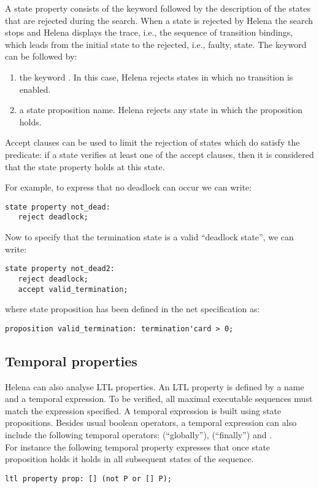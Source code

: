 A state property consists of the keyword  followed by the
description of the states that are rejected during the search.  When a
state is rejected by Helena the search stops and Helena displays the
trace, i.e., the sequence of transition bindings, which leads from the
initial state to the rejected, i.e., faulty, state.  The keyword
 can be followed by:
\begin{enumerate}
\item the keyword .  In this case, Helena rejects states
  in which no transition is enabled.
\item a state proposition name.  Helena rejects any state in which the
  proposition holds.
\end{enumerate}
Accept clauses can be used to limit the rejection of states which do
satisfy the  predicate: if a state verifies at least one of
the accept clauses, then it is considered that the state property
holds at this state.

For example, to express that no deadlock can occur we can write:
\begin{lstlisting}
state property not_dead:
   reject deadlock;
\end{lstlisting}
Now to specify that the termination state is a valid ``deadlock
state'', we can write:
\begin{lstlisting}
state property not_dead2:
   reject deadlock;
   accept valid_termination;
\end{lstlisting}
where state proposition  has been defined in the
net specification as:
\begin{lstlisting}
proposition valid_termination: termination'card > 0;
\end{lstlisting}

\statepropertydef

\subsection{Temporal properties}
Helena can also analyse LTL properties.  An LTL property is defined by
a name and a temporal expression.  To be verified, all maximal
executable sequences must match the expression specified.  A temporal
expression is built using state propositions.  Besides usual boolean
operators, a temporal expression can also include the following
temporal operators: \LS{[]} (``globally''), \LS{<>} (``finally'') and
.\\

For instance the following temporal property expresses that once state
proposition  holds it holds in all subsequent states of the
sequence.
\begin{lstlisting}
ltl property prop: [] (not P or [] P);
\end{lstlisting}

\temporalpropertydef

